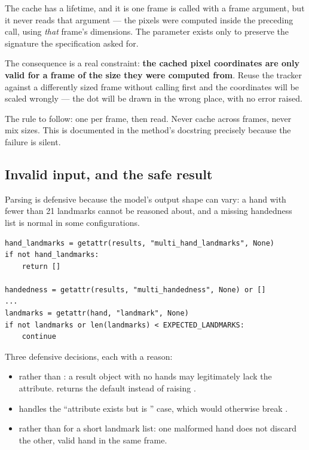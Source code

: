 \begin{edgetrap}{The cache has a lifetime, and it is one frame}
 is called with a frame argument, but it never reads that argument --- the
pixels were computed inside the preceding  call, using \emph{that} frame's
dimensions. The parameter exists only to preserve the signature the specification asked for.

The consequence is a real constraint: \textbf{the cached pixel coordinates are only valid for a frame
of the size they were computed from}. Reuse the tracker against a differently sized frame without
calling  first and the coordinates will be scaled wrongly --- the dot will be drawn
in the wrong place, with no error raised.

The rule to follow: one  per frame, then read. Never cache across frames, never mix
sizes. This is documented in the method's docstring precisely because the failure is silent.
\end{edgetrap}

\subsection{Invalid input, and the safe result}

Parsing is defensive because the model's output shape can vary: a hand with fewer than 21 landmarks
cannot be reasoned about, and a missing handedness list is normal in some configurations.

\begin{codecard}
\begin{lstlisting}
hand_landmarks = getattr(results, "multi_hand_landmarks", None)
if not hand_landmarks:
    return []

handedness = getattr(results, "multi_handedness", None) or []
...
landmarks = getattr(hand, "landmark", None)
if not landmarks or len(landmarks) < EXPECTED_LANDMARKS:
    continue
\end{lstlisting}
\end{codecard}

Three defensive decisions, each with a reason:

\begin{itemize}
  \item {} rather than : a result object
        with no hands may legitimately lack the attribute.  returns the default instead
        of raising .
  \item {} handles the ``attribute exists but is '' case, which would
        otherwise break .
  \item {} rather than  for a short landmark list: one malformed hand does
        not discard the other, valid hand in the same frame.
\end{itemize}

